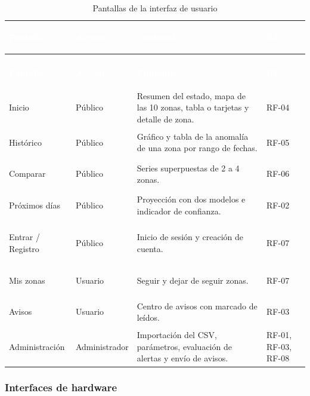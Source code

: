 \documentclass[11pt,a4paper,oneside]{article}
\begin{document}
{\small
\begin{xltabular}{\textwidth}{@{}>{\sffamily\bfseries\raggedright\arraybackslash}p{2.8cm}>{\raggedright\arraybackslash}p{2.2cm}Y>{\raggedright\arraybackslash}p{2.3cm}@{}}
\caption{Pantallas de la interfaz de usuario}\label{tab:pantallas}\\
\textcolor{white}{\sffamily\bfseries\footnotesize Pantalla} & \textcolor{white}{\sffamily\bfseries\footnotesize Acceso} & \textcolor{white}{\sffamily\bfseries\footnotesize Contenido} & \textcolor{white}{\sffamily\bfseries\footnotesize RF}\\
\endfirsthead
{}\\
\textcolor{white}{\sffamily\bfseries\footnotesize Pantalla} & \textcolor{white}{\sffamily\bfseries\footnotesize Acceso} & \textcolor{white}{\sffamily\bfseries\footnotesize Contenido} & \textcolor{white}{\sffamily\bfseries\footnotesize RF}\\
\endhead
Inicio & Público & Resumen del estado, mapa de las 10 zonas, tabla o tarjetas y detalle de zona. & RF-04\\ \hline
{}Histórico & Público & Gráfico y tabla de la anomalía de una zona por rango de fechas. & RF-05\\ \hline
Comparar & Público & Series superpuestas de 2 a 4 zonas. & RF-06\\ \hline
{}Próximos días & Público & Proyección con dos modelos e indicador de confianza. & RF-02\\ \hline
Entrar / Registro & Público & Inicio de sesión y creación de cuenta. & RF-07\\ \hline
{}Mis zonas & Usuario & Seguir y dejar de seguir zonas. & RF-07\\ \hline
Avisos & Usuario & Centro de avisos con marcado de leídos. & RF-03\\ \hline
{}Administración & Administrador & Importación del CSV, parámetros, evaluación de alertas y envío de avisos. & RF-01, RF-03, RF-08\\ \hline
\end{xltabular}}
\vspace{0.6em}

\subsubsection{Interfaces de hardware}
\end{document}
